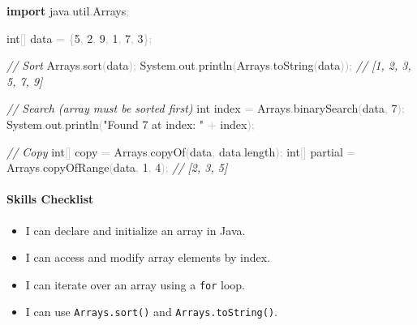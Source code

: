 \documentclass[
  justified,
  openright,
]{tufte-book}
\let\subsection\paragraph
\let\paragraph\paragraph
\newcommand{\KeywordTok}[1]{\textcolor{CodeKeyword}{\textbf{#1}}}  %
\newcommand{\StringTok}[1]{\textcolor{CodeString}{#1}}              %
\newcommand{\CommentTok}[1]{\textcolor{CodeComment}{\textit{#1}}}  %
\newcommand{\CodeNumTok}[1]{\textcolor{CodeNumber}{#1}}             %
\newcommand{\CodeFuncTok}[1]{\textcolor{CodeKeyword}{#1}}           %
\newcommand{\CodeTypeTok}[1]{\textcolor{CodeType}{#1}}              %
\newcommand{\CodeAccentTok}[1]{\textcolor{CodeAccent}{#1}}          %
\newcommand{\OperatorTok}[1]{\textcolor{DarkGray}{#1}}              %
\newenvironment{Shaded}{%
  \begin{mdframed}[style=TufteCode]%
}{%
  \end{mdframed}%
}
\let\subsection\paragraph
\let\paragraph\paragraph
\providecommand{\tightlist}{%
  \setlength{\itemsep}{0pt}\setlength{\parskip}{0pt}}
\begin{document}
\begin{Shaded}
\begin{Highlighting}[]
\KeywordTok{import} \CodeAccentTok{java}\OperatorTok{.}\CodeAccentTok{util}\OperatorTok{.}\CodeAccentTok{Arrays}\OperatorTok{;}
 
\CodeTypeTok{int}\OperatorTok{[]} data \OperatorTok{=} \OperatorTok{\{}\CodeNumTok{5}\OperatorTok{,} \CodeNumTok{2}\OperatorTok{,} \CodeNumTok{9}\OperatorTok{,} \CodeNumTok{1}\OperatorTok{,} \CodeNumTok{7}\OperatorTok{,} \CodeNumTok{3}\OperatorTok{\};}
 
\CommentTok{// Sort}
Arrays\OperatorTok{.}\CodeFuncTok{sort}\OperatorTok{(}data\OperatorTok{);}
System\OperatorTok{.}\CodeFuncTok{out}\OperatorTok{.}\CodeFuncTok{println}\OperatorTok{(}Arrays\OperatorTok{.}\CodeFuncTok{toString}\OperatorTok{(}data\OperatorTok{));}   \CommentTok{// [1, 2, 3, 5, 7, 9]}
 
\CommentTok{// Search (array must be sorted first)}
\CodeTypeTok{int} index \OperatorTok{=} Arrays\OperatorTok{.}\CodeFuncTok{binarySearch}\OperatorTok{(}data\OperatorTok{,} \CodeNumTok{7}\OperatorTok{);}
System\OperatorTok{.}\CodeFuncTok{out}\OperatorTok{.}\CodeFuncTok{println}\OperatorTok{(}\StringTok{"Found 7 at index: "} \OperatorTok{+} index\OperatorTok{);}
 
\CommentTok{// Copy}
\CodeTypeTok{int}\OperatorTok{[]} copy \OperatorTok{=} Arrays\OperatorTok{.}\CodeFuncTok{copyOf}\OperatorTok{(}data\OperatorTok{,} data\OperatorTok{.}\CodeFuncTok{length}\OperatorTok{);}
\CodeTypeTok{int}\OperatorTok{[]} partial \OperatorTok{=} Arrays\OperatorTok{.}\CodeFuncTok{copyOfRange}\OperatorTok{(}data\OperatorTok{,} \CodeNumTok{1}\OperatorTok{,} \CodeNumTok{4}\OperatorTok{);}  \CommentTok{// [2, 3, 5]}
\end{Highlighting}
\end{Shaded}

\subsection{Skills Checklist}\label{skills-checklist-77}

\begin{itemize}
\tightlist
\item[$\square$]
  I can declare and initialize an array in Java.
\item[$\square$]
  I can access and modify array elements by index.
\item[$\square$]
  I can iterate over an array using a \texttt{for} loop.
\item[$\square$]
  I can use \texttt{Arrays.sort()} and \texttt{Arrays.toString()}.
\end{itemize}
\end{document}

